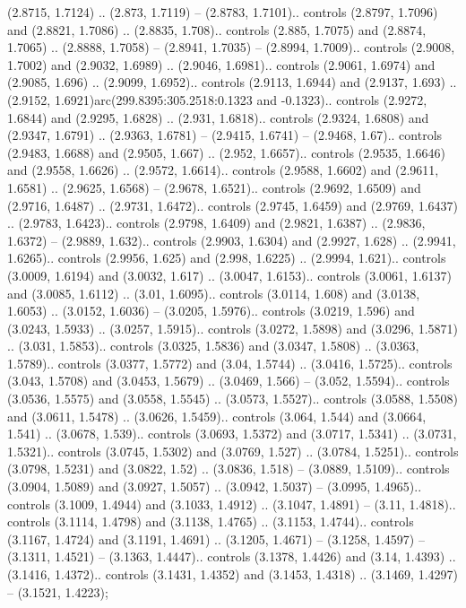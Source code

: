 (2.8715, 1.7124) .. (2.873, 1.7119) -- (2.8783, 1.7101).. controls (2.8797, 1.7096) and (2.8821, 1.7086) .. (2.8835, 1.708).. controls (2.885, 1.7075) and (2.8874, 1.7065) .. (2.8888, 1.7058) -- (2.8941, 1.7035) -- (2.8994, 1.7009).. controls (2.9008, 1.7002) and (2.9032, 1.6989) .. (2.9046, 1.6981).. controls (2.9061, 1.6974) and (2.9085, 1.696) .. (2.9099, 1.6952).. controls (2.9113, 1.6944) and (2.9137, 1.693) .. (2.9152, 1.6921)arc(299.8395:305.2518:0.1323 and -0.1323).. controls (2.9272, 1.6844) and (2.9295, 1.6828) .. (2.931, 1.6818).. controls (2.9324, 1.6808) and (2.9347, 1.6791) .. (2.9363, 1.6781) -- (2.9415, 1.6741) -- (2.9468, 1.67).. controls (2.9483, 1.6688) and (2.9505, 1.667) .. (2.952, 1.6657).. controls (2.9535, 1.6646) and (2.9558, 1.6626) .. (2.9572, 1.6614).. controls (2.9588, 1.6602) and (2.9611, 1.6581) .. (2.9625, 1.6568) -- (2.9678, 1.6521).. controls (2.9692, 1.6509) and (2.9716, 1.6487) .. (2.9731, 1.6472).. controls (2.9745, 1.6459) and (2.9769, 1.6437) .. (2.9783, 1.6423).. controls (2.9798, 1.6409) and (2.9821, 1.6387) .. (2.9836, 1.6372) -- (2.9889, 1.632).. controls (2.9903, 1.6304) and (2.9927, 1.628) .. (2.9941, 1.6265).. controls (2.9956, 1.625) and (2.998, 1.6225) .. (2.9994, 1.621).. controls (3.0009, 1.6194) and (3.0032, 1.617) .. (3.0047, 1.6153).. controls (3.0061, 1.6137) and (3.0085, 1.6112) .. (3.01, 1.6095).. controls (3.0114, 1.608) and (3.0138, 1.6053) .. (3.0152, 1.6036) -- (3.0205, 1.5976).. controls (3.0219, 1.596) and (3.0243, 1.5933) .. (3.0257, 1.5915).. controls (3.0272, 1.5898) and (3.0296, 1.5871) .. (3.031, 1.5853).. controls (3.0325, 1.5836) and (3.0347, 1.5808) .. (3.0363, 1.5789).. controls (3.0377, 1.5772) and (3.04, 1.5744) .. (3.0416, 1.5725).. controls (3.043, 1.5708) and (3.0453, 1.5679) .. (3.0469, 1.566) -- (3.052, 1.5594).. controls (3.0536, 1.5575) and (3.0558, 1.5545) .. (3.0573, 1.5527).. controls (3.0588, 1.5508) and (3.0611, 1.5478) .. (3.0626, 1.5459).. controls (3.064, 1.544) and (3.0664, 1.541) .. (3.0678, 1.539).. controls (3.0693, 1.5372) and (3.0717, 1.5341) .. (3.0731, 1.5321).. controls (3.0745, 1.5302) and (3.0769, 1.527) .. (3.0784, 1.5251).. controls (3.0798, 1.5231) and (3.0822, 1.52) .. (3.0836, 1.518) -- (3.0889, 1.5109).. controls (3.0904, 1.5089) and (3.0927, 1.5057) .. (3.0942, 1.5037) -- (3.0995, 1.4965).. controls (3.1009, 1.4944) and (3.1033, 1.4912) .. (3.1047, 1.4891) -- (3.11, 1.4818).. controls (3.1114, 1.4798) and (3.1138, 1.4765) .. (3.1153, 1.4744).. controls (3.1167, 1.4724) and (3.1191, 1.4691) .. (3.1205, 1.4671) -- (3.1258, 1.4597) -- (3.1311, 1.4521) -- (3.1363, 1.4447).. controls (3.1378, 1.4426) and (3.14, 1.4393) .. (3.1416, 1.4372).. controls (3.1431, 1.4352) and (3.1453, 1.4318) .. (3.1469, 1.4297) -- (3.1521, 1.4223);



